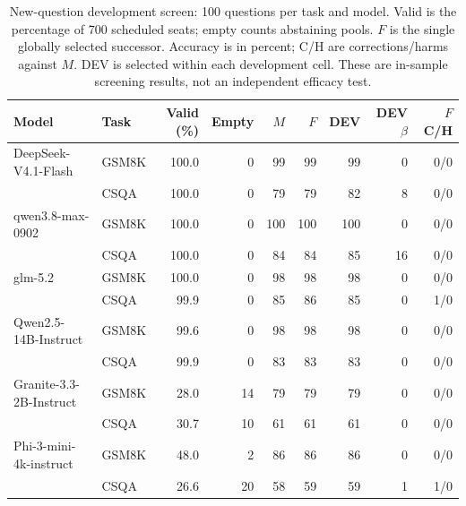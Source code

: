 \begin{table}[!t]\centering\small
\caption{New-question development screen: 100 questions per task and model. Valid is the percentage of 700 scheduled seats; empty counts abstaining pools. $F$ is the single globally selected successor. Accuracy is in percent; C/H are corrections/harms against $M$. DEV is selected within each development cell. These are in-sample screening results, not an independent efficacy test.}\label{tab:followup-development}
\begin{tabular}{@{}llrrrrrrr@{}}\toprule
Model & Task & Valid (\%) & Empty & $M$ & $F$ & DEV & DEV $\beta$ & $F$ C/H\\\midrule
DeepSeek-V4.1-Flash & GSM8K & 100.0 & 0 & 99 & 99 & 99 & 0 & 0/0\\
 & CSQA & 100.0 & 0 & 79 & 79 & 82 & 8 & 0/0\\
qwen3.8-max-0902 & GSM8K & 100.0 & 0 & 100 & 100 & 100 & 0 & 0/0\\
 & CSQA & 100.0 & 0 & 84 & 84 & 85 & 16 & 0/0\\
glm-5.2 & GSM8K & 100.0 & 0 & 98 & 98 & 98 & 0 & 0/0\\
 & CSQA & 99.9 & 0 & 85 & 86 & 85 & 0 & 1/0\\
Qwen2.5-14B-Instruct & GSM8K & 99.6 & 0 & 98 & 98 & 98 & 0 & 0/0\\
 & CSQA & 99.9 & 0 & 83 & 83 & 83 & 0 & 0/0\\
Granite-3.3-2B-Instruct & GSM8K & 28.0 & 14 & 79 & 79 & 79 & 0 & 0/0\\
 & CSQA & 30.7 & 10 & 61 & 61 & 61 & 0 & 0/0\\
Phi-3-mini-4k-instruct & GSM8K & 48.0 & 2 & 86 & 86 & 86 & 0 & 0/0\\
 & CSQA & 26.6 & 20 & 58 & 59 & 59 & 1 & 1/0\\
\bottomrule\end{tabular}\end{table}
